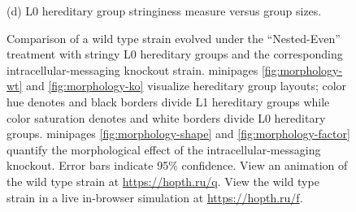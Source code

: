 \begin{figure}[!htbp]
\begin{center}
\begin{minipage}[t]{0.5\linewidth}
\hspace*{\fill}%
\begin{minipage}[t]{\columnwidth}
\centering
\vspace{0pt} %
\begin{minipage}[b]{\textwidth}
{(d) L0 hereditary group stringiness measure versus group sizes.}
\end{minipage}
\end{minipage}%
\hspace*{\fill}

\end{minipage}

\caption{
Comparison of a wild type strain evolved under the ``Nested-Even'' treatment with stringy L0 hereditary groups and the corresponding intracellular-messaging knockout strain.
minipages \ref{fig:morphology-wt} and \ref{fig:morphology-ko} visualize hereditary group layouts;
color hue denotes and black borders divide L1 hereditary groups while color saturation denotes and white borders divide L0 hereditary groups.
minipages \ref{fig:morphology-shape} and \ref{fig:morphology-factor} quantify the morphological effect of the intracellular-messaging knockout.
Error bars indicate 95\% confidence.
View an animation of the wild type strain at \url{https://hopth.ru/q}.
View the wild type strain in a live in-browser simulation at \url{https://hopth.ru/f}.
}
\label{fig:ko-morphology}
\end{center}
\end{figure}
